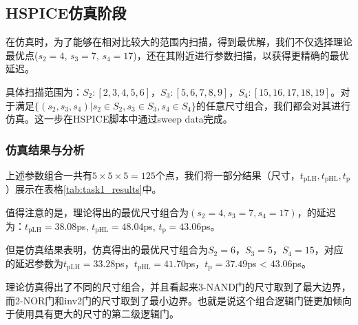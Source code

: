 \documentclass[UTF8,12pt,a4paper]{ctexart}
\begin{document}
\subsection{HSPICE仿真阶段}

在仿真时，为了能够在相对比较大的范围内扫描，得到最优解，我们不仅选择理论最优点($s_2 = 4$, $s_3 = 7$, $s_4 = 17$)，还在其附近进行参数扫描，以获得更精确的最优延迟。

具体扫描范围为：$S_2: [2,3,4,5,6]$，$S_3:[5,6,7,8,9]$，$S_4:[15,16,17,18,19]$。对于满足$\{(s_2, s_3, s_4)| s_2 \in S_2, s_3 \in S_3, s_4 \in S_4\}$的任意尺寸组合，我们都会对其进行仿真。这一步在HSPICE脚本中通过sweep data完成。

\subsubsection{仿真结果与分析}
上述参数组合一共有$5\times5\times5=125$个点，我们将一部分结果（尺寸，$t_{\text{pLH}}, t_{\text{pHL}}, t_{\text{p}}$）展示在表格\ref{tab:task1_results}中。

值得注意的是，理论得出的最优尺寸组合为$(s_2 = 4, s_3 = 7, s_4 = 17)$，的延迟为：$t_{\text{pLH}}=38.08$ps, $t_{\text{pHL}} = 48.04$ps, $t_{\text{p}} = 43.06$ps。

但是仿真结果表明，仿真得出的最优尺寸组合为$S_2 = 6$，$S_3 = 5$，$S_4 = 15$，对应的延迟参数为$t_{\text{pLH}} = 33.28$ps，$t_{\text{pHL}} = 41.70$ps，$t_{\text{p}} = 37.49$ps < $43.06$ps。

理论仿真得出了不同的尺寸组合，并且看起来3-NAND门的尺寸取到了最大边界，而2-NOR门和inv2门的尺寸取到了最小边界。也就是说这个组合逻辑门链更加倾向于使用具有更大的尺寸的第二级逻辑门。
\end{document}
